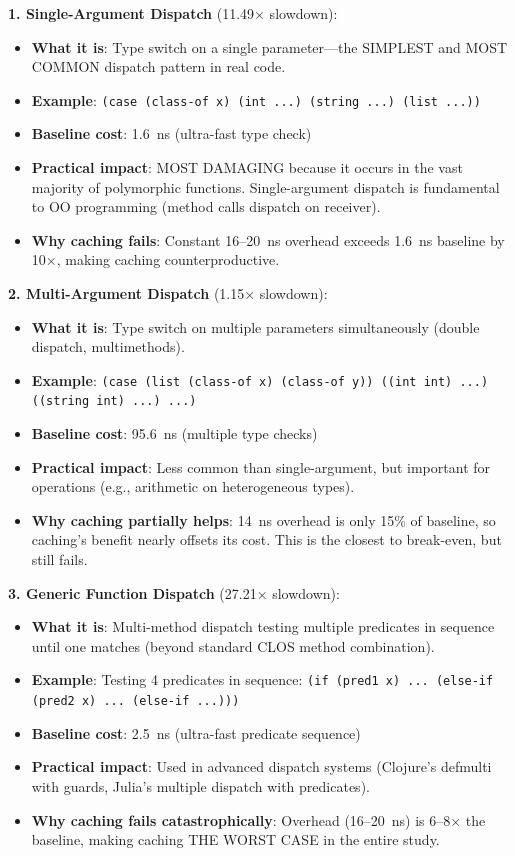 \documentclass[sigplan,final]{acmart}
\begin{document}
\textbf{1. Single-Argument Dispatch} (11.49× slowdown):
\begin{itemize}
  \item \textbf{What it is}: Type switch on a single parameter—the SIMPLEST and MOST COMMON dispatch pattern in real code.
  \item \textbf{Example}: \texttt{(case (class-of x) (int ...) (string ...) (list ...))}
  \item \textbf{Baseline cost}: 1.6~ns (ultra-fast type check)
  \item \textbf{Practical impact}: MOST DAMAGING because it occurs in the vast majority of polymorphic functions. Single-argument dispatch is fundamental to OO programming (method calls dispatch on receiver).
  \item \textbf{Why caching fails}: Constant 16--20~ns overhead exceeds 1.6~ns baseline by 10×, making caching counterproductive.
\end{itemize}

\textbf{2. Multi-Argument Dispatch} (1.15× slowdown):
\begin{itemize}
  \item \textbf{What it is}: Type switch on multiple parameters simultaneously (double dispatch, multimethods).
  \item \textbf{Example}: \texttt{(case (list (class-of x) (class-of y)) ((int int) ...) ((string int) ...) ...)}
  \item \textbf{Baseline cost}: 95.6~ns (multiple type checks)
  \item \textbf{Practical impact}: Less common than single-argument, but important for operations (e.g., arithmetic on heterogeneous types).
  \item \textbf{Why caching partially helps}: 14~ns overhead is only 15\% of baseline, so caching's benefit nearly offsets its cost. This is the closest to break-even, but still fails.
\end{itemize}

\textbf{3. Generic Function Dispatch} (27.21× slowdown):
\begin{itemize}
  \item \textbf{What it is}: Multi-method dispatch testing multiple predicates in sequence until one matches (beyond standard CLOS method combination).
  \item \textbf{Example}: Testing 4 predicates in sequence: \texttt{(if (pred1 x) ... (else-if (pred2 x) ... (else-if ...)))}
  \item \textbf{Baseline cost}: 2.5~ns (ultra-fast predicate sequence)
  \item \textbf{Practical impact}: Used in advanced dispatch systems (Clojure's defmulti with guards, Julia's multiple dispatch with predicates).
  \item \textbf{Why caching fails catastrophically}: Overhead (16--20~ns) is 6--8× the baseline, making caching THE WORST CASE in the entire study.
\end{itemize}
\end{document}
